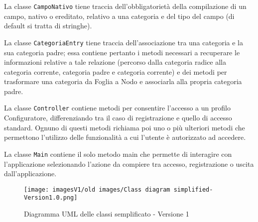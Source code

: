 La classe \texttt{CampoNativo} tiene traccia dell'obbligatorietà della compilazione di un campo, nativo o ereditato, relativo a una categoria e del tipo del campo (di default si tratta di stringhe). 

La classe \texttt{CategoriaEntry} tiene traccia dell'associazione tra una categoria e la sua categoria padre; essa contiene pertanto i metodi necessari a recuperare le informazioni relative a tale relazione (percorso dalla categoria radice alla categoria corrente, categoria padre e categoria corrente) e dei metodi per trasformare una categoria da Foglia a Nodo e associarla alla propria categoria padre.

La classe \texttt{Controller} contiene metodi per consentire l'accesso a un profilo Configuratore, differenziando tra il caso di registrazione e quello di accesso standard. Ognuno di questi metodi richiama poi uno o più ulteriori metodi che permettono l'utilizzo delle funzionalità a cui l'utente è autorizzato ad accedere.

La classe \texttt{Main} contiene il solo metodo main che permette di interagire con l'applicazione selezionando l'azione da compiere tra accesso, registrazione o uscita dall'applicazione.

\begin{figure}[!]
    \centering
    \texttt{[image: imagesV1/old images/Class diagram simplified-Version1.0.png]}
    \caption{\label{fig:Simplified Class Diagram - v1}Diagramma UML delle classi semplificato - Versione 1}
\end{figure}